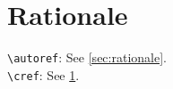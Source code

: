 \documentclass[onecolumn]{article}
\theoremstyle{definition}
\theoremstyle{remark}
\begin{document}

\appendix
\onecolumn
\maketitlesupplementary

\section{Rationale}
\label{sec:rationale}

\verb+\autoref+: See \autoref{sec:rationale}. \\
\verb+\cref+: See \cref{sec:rationale}.

\lipsum[10]
\end{document}
